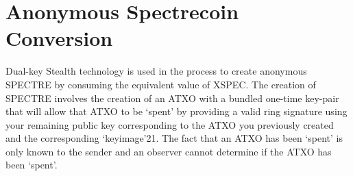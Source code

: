 \section{Anonymous Spectrecoin Conversion}
Dual-key Stealth technology is used in the process to create anonymous SPECTRE by consuming the equivalent value of XSPEC. The creation of SPECTRE involves the creation of an ATXO with a bundled one-time key-pair that will allow that ATXO to be ‘spent’ by providing a valid ring signature using your remaining public key corresponding to the ATXO you previously created and the corresponding ‘keyimage’21. The fact that an ATXO has been ‘spent’ is only known to the sender and an observer cannot determine if the ATXO has been ‘spent’.